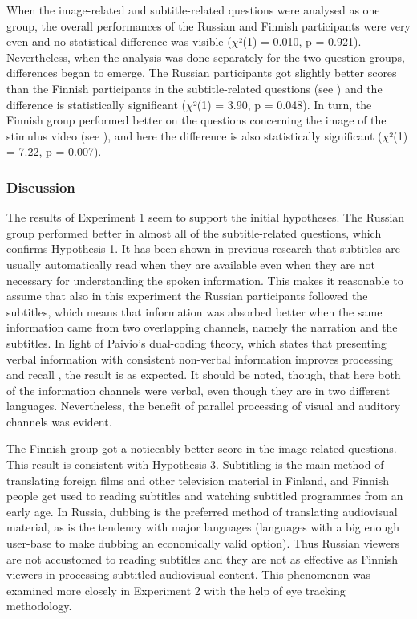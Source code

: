 \documentclass[output=paper]{langsci/langscibook}
\begin{document}
When the image-related and subtitle-related questions were analysed as one group, the overall performances of the Russian and Finnish participants were very even and no statistical difference was visible ($\chi $²(1) = 0.010, p = 0.921). Nevertheless, when the analysis was done separately for the two question groups, differences began to emerge. The Russian participants got slightly better scores than the Finnish participants in the subtitle-related questions (see ) and the difference is statistically significant ($\chi $²(1) = 3.90, p = 0.048).  In turn, the Finnish group performed better on the questions concerning the image of the stimulus video (see ), and here the difference is also statistically significant ($\chi $²(1) = 7.22, p = 0.007).

\subsubsection{Discussion}
\largerpage
The results of Experiment 1 seem to support the initial hypotheses. The Russian group performed better in almost all of the subtitle-related questions, which confirms Hypothesis 1. It has been shown in previous research \citep{dydewalle1987} that subtitles are usually automatically read when they are available even when they are not necessary for understanding the spoken information. This makes it reasonable to assume that also in this experiment the Russian participants followed the subtitles, which means that information was absorbed better when the same information came from two overlapping channels, namely the narration and the subtitles. In light of Paivio's dual-coding theory, which states that presenting verbal information with consistent non-verbal information improves processing and recall \citep{Paivio1986}, the result is as expected. It should be noted, though, that here both of the information channels were verbal, even though they are in two different languages. Nevertheless, the benefit of parallel processing of visual and auditory channels was evident. 

The Finnish group got a noticeably better score in the image-related questions. This result is consistent with Hypothesis 3. Subtitling is the main method of translating foreign films and other television material in Finland, and Finnish people get used to reading subtitles and watching subtitled programmes from an early age. In Russia, dubbing is the preferred method of translating audiovisual material, as is the tendency with major languages (languages with a big enough user-base to make dubbing an economically valid option). Thus Russian viewers are not accustomed to reading subtitles and they are not as effective as Finnish viewers in processing subtitled audiovisual content. This phenomenon was examined more closely in Experiment 2 with the help of eye tracking methodology.
\end{document}
